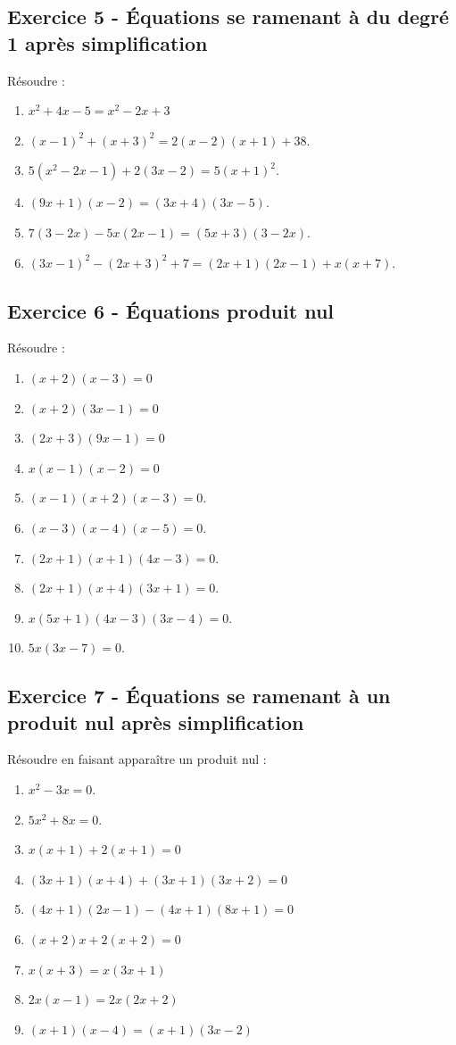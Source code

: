\documentclass[14 pt]{extarticle}
\renewcommand\it\item
\theoremstyle{plain}
\begin{document}
  \subsection*{Exercice 5 - Équations se ramenant à du degré 1 après simplification}
  Résoudre :\begin{enumerate}
  \it $x^2+ 4x - 5 = x^2 - 2x + 3$
\it $(x-1)^2+(x+3)^2= 2(x-2)(x+1)+38$.
\it $5(x^2-2x-1)+2(3x-2)=5(x+1)^2$.
\it $(9x+1)(x-2)=(3x+4)(3x-5)$.
\it $7(3-2x)-5x(2x-1)=(5x+3)(3-2x)$. 
\it $(3x-1)^2-(2x+3)^2+7 = (2x+1)(2x-1) + x(x+7)$.
  \end{enumerate}
  \subsection*{Exercice 6 - Équations produit nul}
  Résoudre : \begin{enumerate}
  \it $(x+2)(x-3) = 0$
  \it $(x+2)(3x-1)=0$
  \it $(2x+3)(9x-1)=0$
  \it $x(x-1)(x-2)=0$
  \it $(x-1)(x+2)(x-3)=0$. 
\it $(x-3)(x-4)(x-5)=0$. 
\it $(2x+1)(x+1)(4x-3) = 0$.
\it $(2x+1)(x+4)(3x+1)=0$. 
\it $x(5x+1)(4x-3)(3x-4)=0$. 
\it $5x(3x-7)=0$.   
  \end{enumerate}
 
  \subsection*{Exercice 7 - Équations se ramenant à un produit nul après simplification}
  Résoudre en faisant apparaître un produit nul : 
  \begin{enumerate}
\it $x^2-3x=0$. 
\it $5x^2+8x=0$. 
\it $x(x+1) + 2(x+1) = 0$
\it $(3x+1)(x+4) + (3x+1)(3x+2) =0$
\it $(4x+1)(2x-1)-(4x+1)(8x+1)=0$
\it $(x+2)x +2(x+2)=0$
\it $x(x+3) = x(3x+1)$
\it $2x(x-1) = 2x(2x+2)$
\it $(x+1)(x-4) = (x+1)(3x-2)$

  \end{enumerate}
  
  
  
 	
\end{document}
